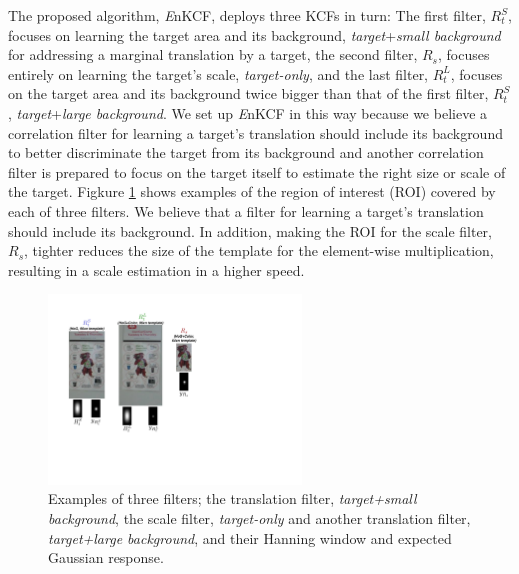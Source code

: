 \documentclass{bmvc2k}
\begin{document}
The proposed algorithm, {\it E}nKCF, deploys three KCFs in turn: The
first filter, $R_{t}^{S}$, focuses on learning the target area and its
background, \textit{target}+\textit{small background} for addressing a
marginal translation by a target, the second filter, $R_{s}$, focuses
entirely on learning the target's scale, \textit{target-only}, and the
last filter, $R_{t}^{L}$, focuses on the target area and its
background twice bigger than that of the first filter, $R_{t}^{S}$,
\textit{target}+\textit{large background}. We set up {\it E}nKCF in
this way because we believe a correlation filter for learning a
target's translation should include its background to better
discriminate the target from its background and another correlation
filter is prepared to focus on the target itself to estimate the right
size or scale of the target. Figkure \ref{fig:Filters} shows examples
of the region of interest (ROI) covered by each of three filters. We
believe that a filter for learning a target's translation should
include its background. In addition, making the ROI for the scale
filter, $R_{s}$, tighter reduces the size of the template for the
element-wise multiplication, resulting in a scale estimation in a
higher speed.

\begin{figure}[!h]
\centering
\includegraphics[width=0.6\textwidth]{figures/Filters_Details.pdf}
\caption{Examples of three filters; the translation filter,
  \textit{target+small background}, the scale filter,
  \textit{target-only} and another translation filter,
  \textit{target+large background}, and their Hanning window and
  expected Gaussian response.}
\label{fig:Filters}
\end{figure}
\end{document}
